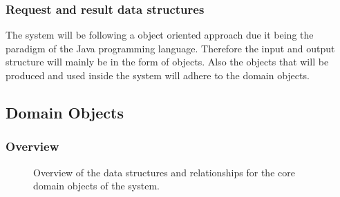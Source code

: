 \documentclass[12pt]{article}
\begin{document}
\subsubsection{Request and result data structures}
The system will be following a object oriented approach due it being the paradigm of the Java programming language. Therefore the input and output structure will mainly be in the form of objects. Also the objects that will be produced and used inside the system will adhere to the domain objects.

\vspace{0.2in}



\subsection{Domain Objects}
\subsubsection{Overview}

\begin{figure}[H]
\centering	
{}
\caption{Overview of the data structures and relationships for the core domain objects of the
system.}
\end{figure}
\end{document}
